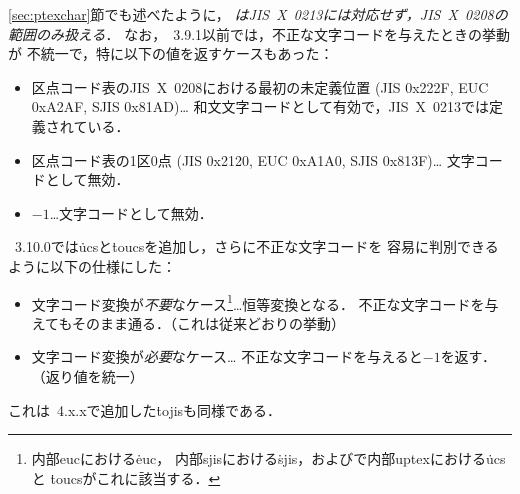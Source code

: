 \documentclass[a4paper,11pt,nomag,dvipdfmx]{jsarticle}
\begin{document}
\begin{dangerous}
  \ref{sec:ptexchar}節でも述べたように，
  \emph{\pTeX はJIS~X~0213には対応せず，JIS~X~0208の範囲のみ扱える}．
  なお，\pTeX~3.9.1以前では，不正な文字コードを与えたときの挙動が
  不統一で，特に以下の値を返すケースもあった：
  \begin{itemize}
    \item 区点コード表のJIS~X~0208における最初の未定義位置
          (JIS 0x222F, EUC 0xA2AF, SJIS 0x81AD)…
          和文文字コードとして有効で，JIS~X~0213では定義されている．
    \item 区点コード表の1区0点
          (JIS 0x2120, EUC 0xA1A0, SJIS 0x813F)…
          文字コードとして無効．
    \item $-1$…文字コードとして無効．
  \end{itemize}
  \pTeX~3.10.0では\.{ucs}と\.{toucs}を追加し，さらに不正な文字コードを
  容易に判別できるように以下の仕様にした：
  \begin{itemize}
    \item 文字コード変換が\emph{不要}なケース\footnote{内部eucにおける\.{euc}，
        内部sjisにおける\.{sjis}，および\upTeX で内部uptexにおける\.{ucs}と
        \.{toucs}がこれに該当する．}…恒等変換となる．
        不正な文字コードを与えてもそのまま通る．（これは従来どおりの挙動）
    \item 文字コード変換が\emph{必要}なケース…
        不正な文字コードを与えると$-1$を返す．（返り値を統一）
  \end{itemize}
\ifx\tojis\undefined\else
%
  これは\pTeX~4.x.xで追加した\.{tojis}も同様である．
%
\fi
%
%
%
\end{dangerous}
\end{document}
